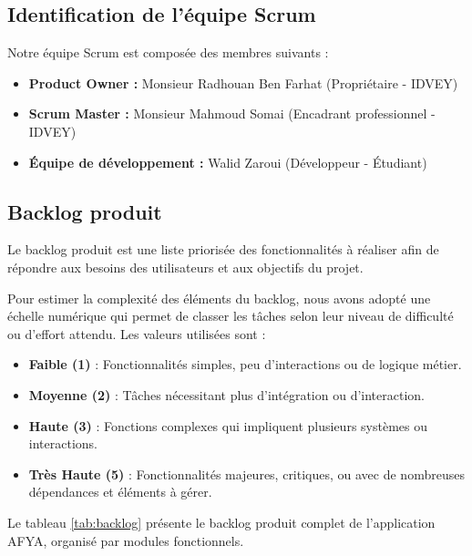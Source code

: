 \subsection{Identification de l'équipe Scrum}
Notre équipe Scrum est composée des membres suivants :

\begin{itemize}[label=\textbullet]
    \item \textbf{Product Owner :} Monsieur Radhouan Ben Farhat (Propriétaire - IDVEY)
    \item \textbf{Scrum Master :} Monsieur Mahmoud Somai (Encadrant professionnel - IDVEY)
    \item \textbf{Équipe de développement :} Walid Zaroui (Développeur - Étudiant)
\end{itemize}

\subsection{Backlog produit}
Le backlog produit est une liste priorisée des fonctionnalités à réaliser afin de répondre aux besoins des utilisateurs et aux objectifs du projet.

Pour estimer la complexité des éléments du backlog, nous avons adopté une échelle numérique qui permet de classer les tâches selon leur niveau de difficulté ou d'effort attendu. Les valeurs utilisées sont :

\begin{itemize}[label=\textbullet]
    \item \textbf{Faible (1)} : Fonctionnalités simples, peu d'interactions ou de logique métier.
    \item \textbf{Moyenne (2)} : Tâches nécessitant plus d'intégration ou d'interaction.
    \item \textbf{Haute (3)} : Fonctions complexes qui impliquent plusieurs systèmes ou interactions.
    \item \textbf{Très Haute (5)} : Fonctionnalités majeures, critiques, ou avec de nombreuses dépendances et éléments à gérer.
\end{itemize}

Le tableau \ref{tab:backlog} présente le backlog produit complet de l'application AFYA, organisé par modules fonctionnels.

